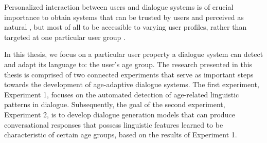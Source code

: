 Personalized interaction between users and dialogue systems is of crucial importance to obtain systems that can be trusted by users and perceived as natural \citep{van2019exploring}, but most of all to be accessible to varying user profiles, rather than targeted at one particular user group \citep{zheng2019personalized, zeng-etal-2020-meddialog}. 

In this thesis, we focus on a particular user property a dialogue system can detect and adapt its language to: the user's age group. 
The research presented in this thesis is comprised of two connected experiments that serve as important steps towards the development of age-adaptive dialogue systems.
The first experiment, Experiment 1, focuses on the automated detection of age-related linguistic patterns in dialogue. Subsequently, the goal of the second experiment, Experiment 2, is to develop dialogue generation models that can produce conversational responses that possess linguistic features learned to be characteristic of certain age groups, based on the results of Experiment 1. 

